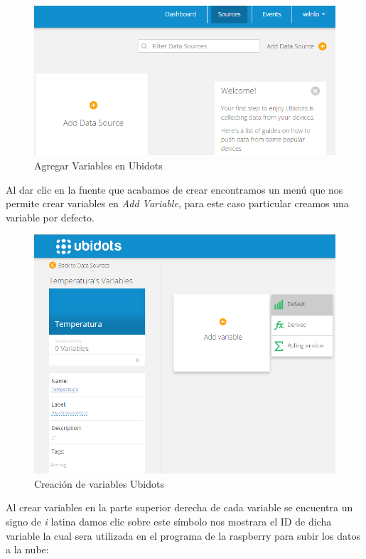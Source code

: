 \documentclass[10pt]{article}\usepackage[]{graphicx}\usepackage[]{color}
\begin{document}
 	\begin{figure}[ht]
 		\centering
 		\includegraphics[scale=0.3]{ubi3}   %
 		\caption{Agregar Variables en Ubidots} 		
 	\end{figure}  

Al dar clic en la fuente que acabamos de crear encontramos un menú que nos permite crear variables en \textit{Add Variable}, para este caso particular creamos una variable por defecto.

 	\begin{figure}[ht]
 		\centering
 		\includegraphics[scale=0.3]{ubi4}   %
 		\caption{Creación de variables Ubidots} 		
 	\end{figure}  
	
Al crear variables en la parte superior derecha de cada variable se encuentra un signo de \textit{i} latina damos clic sobre este símbolo nos mostrara el ID de dicha variable la cual sera utilizada en el programa de la raspberry para subir los datos a la nube:
\end{document}
